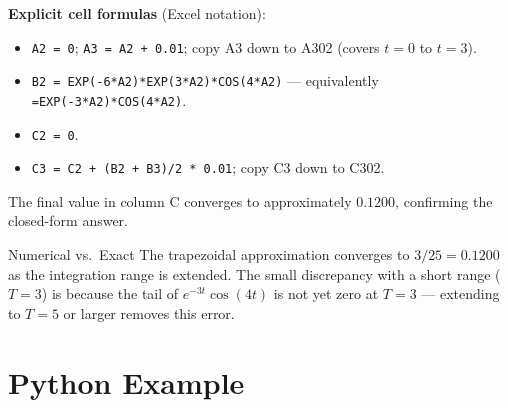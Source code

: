 \documentclass[12pt,a4paper]{article}
\begin{document}
\textbf{Explicit cell formulas} (Excel notation):
\begin{itemize}[noitemsep]
  \item \texttt{A2 = 0}; \texttt{A3 = A2 + 0.01}; copy A3 down to A302 (covers $t=0$ to $t=3$).
  \item \texttt{B2 = EXP(-6*A2)*EXP(3*A2)*COS(4*A2)} --- equivalently \texttt{=EXP(-3*A2)*COS(4*A2)}.
  \item \texttt{C2 = 0}.
  \item \texttt{C3 = C2 + (B2 + B3)/2 * 0.01}; copy C3 down to C302.
\end{itemize}

The final value in column C converges to approximately $0.1200$, confirming the closed-form answer.

\begin{learnbox}{Numerical vs.\ Exact}
The trapezoidal approximation converges to $3/25 = 0.1200$ as the integration range is extended.
The small discrepancy with a short range ($T = 3$) is because the tail of $e^{-3t}\cos(4t)$
is not yet zero at $T=3$ --- extending to $T=5$ or larger removes this error.
\end{learnbox}

\section{Python Example}
\end{document}
